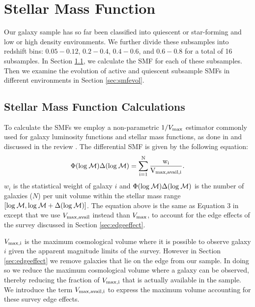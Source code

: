 \documentclass{emulateapj}
\begin{document}
\section{Stellar Mass Function} \label{sec:smf}
Our galaxy sample has so far been classified into quiescent or
star-forming and low or high density environments. We further divide
these subsamples into redshift bins: $0.05-0.12$, $0.2-0.4$,
$0.4-0.6$, and $0.6-0.8$ for a total of 16 subsamples. In Section \ref{sec:smfcalc}, we calculate the SMF for each of these subsamples. Then we examine the evolution of active and quiescent subsample SMFs in different environments in Section \ref{sec:smfevol}.  
\subsection{Stellar Mass Function Calculations} \label{sec:smfcalc} 
To calculate the SMFs we employ a non-parametric $1/{V_{\rm{max}}}$ estimator commonly used for galaxy luminosity functions and stellar mass functions, as done in \cite{Moustakas:2013aa} and discussed in the review \cite{Johnston:2011aa}. The differential SMF is given by the following equation:
\begin{equation} \label{eq:phi}
\Phi(\rm{log}\: \mathcal{M}) \Delta(\rm{log} \:\mathcal{M}) = \sum\limits_{i=1}^{N} \frac{w_i}{V_{\rm{max,avail},i}}. 
\end{equation}
$w_i$ is the statistical weight of galaxy $i$ and $\Phi(\rm{log}\:
\mathcal{M}) \Delta(\rm{log}\: \mathcal{M})$ is the number of galaxies
($N$) per unit volume within the stellar mass range $[\rm{log}
  \:\mathcal{M}, \rm{log} \:\mathcal{M}+\Delta(\rm{log}
  \:\mathcal{M})]$. The equation above is the same as Equation 3 in \cite{Moustakas:2013aa} except that we use $V_{\rm{max,avail}}$ instead than $V_{\rm{max}}$, to account for the edge effects of the survey discussed in Section \ref{sec:edgeeffect}. 

$V_{\rm{max},i}$ is the maximum cosmological volume where it is
possible to observe galaxy $i$ given the apparent magnitude limits of
the survey. However in Section \ref{sec:edgeeffect} we remove galaxies
that lie on the edge from our sample. In doing so we reduce the
maximum cosmological volume where a galaxy can be observed, thereby
reducing the fraction of $V_{\rm{max},i}$ that is actually available
in the sample. We introduce the term $V_{\rm{max,avail},i}$ to express
the maximum volume accounting for these survey edge effects.
\end{document}
